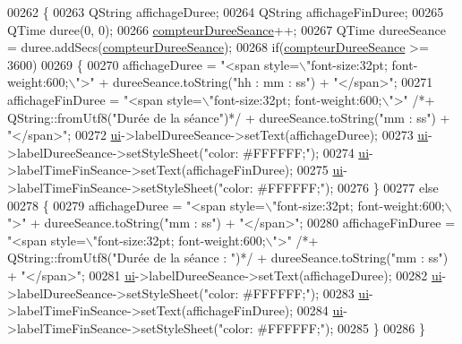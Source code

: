 \begin{DoxyCode}
00262 \{
00263     QString affichageDuree;
00264     QString affichageFinDuree;
00265     QTime duree(0, 0);
00266     \hyperlink{class_ttpa_ihm_abb5ab7cc023685e40cb278f0210f276f}{compteurDureeSeance}++;
00267     QTime dureeSeance = duree.addSecs(\hyperlink{class_ttpa_ihm_abb5ab7cc023685e40cb278f0210f276f}{compteurDureeSeance});
00268     \textcolor{keywordflow}{if}(\hyperlink{class_ttpa_ihm_abb5ab7cc023685e40cb278f0210f276f}{compteurDureeSeance} >= 3600)
00269     \{
00270         affichageDuree = \textcolor{stringliteral}{"<span style=\(\backslash\)"font-size:32pt; font-weight:600;\(\backslash\)">"} + dureeSeance.toString(\textcolor{stringliteral}{"hh :
       mm : ss"}) + \textcolor{stringliteral}{"</span>"};
00271         affichageFinDuree = \textcolor{stringliteral}{"<span style=\(\backslash\)"font-size:32pt; font-weight:600;\(\backslash\)">"} \textcolor{comment}{/*+
       QString::fromUtf8("Durée de la séance")*/} + dureeSeance.toString(\textcolor{stringliteral}{"mm : ss"}) + \textcolor{stringliteral}{"</span>"};
00272         \hyperlink{class_ttpa_ihm_ad5fae1222a667da158c26f3d0f0dce23}{ui}->labelDureeSeance->setText(affichageDuree);
00273         \hyperlink{class_ttpa_ihm_ad5fae1222a667da158c26f3d0f0dce23}{ui}->labelDureeSeance->setStyleSheet(\textcolor{stringliteral}{"color: #FFFFFF;"});
00274         \hyperlink{class_ttpa_ihm_ad5fae1222a667da158c26f3d0f0dce23}{ui}->labelTimeFinSeance->setText(affichageFinDuree);
00275         \hyperlink{class_ttpa_ihm_ad5fae1222a667da158c26f3d0f0dce23}{ui}->labelTimeFinSeance->setStyleSheet(\textcolor{stringliteral}{"color: #FFFFFF;"});
00276     \}
00277     \textcolor{keywordflow}{else}
00278     \{
00279         affichageDuree = \textcolor{stringliteral}{"<span style=\(\backslash\)"font-size:32pt; font-weight:600;\(\backslash\)">"}  + dureeSeance.toString(\textcolor{stringliteral}{"mm :
       ss"}) + \textcolor{stringliteral}{"</span>"};
00280         affichageFinDuree = \textcolor{stringliteral}{"<span style=\(\backslash\)"font-size:32pt; font-weight:600;\(\backslash\)">"} \textcolor{comment}{/*+
       QString::fromUtf8("Durée de la séance : ")*/} + dureeSeance.toString(\textcolor{stringliteral}{"mm : ss"}) + \textcolor{stringliteral}{"</span>"};
00281         \hyperlink{class_ttpa_ihm_ad5fae1222a667da158c26f3d0f0dce23}{ui}->labelDureeSeance->setText(affichageDuree);
00282         \hyperlink{class_ttpa_ihm_ad5fae1222a667da158c26f3d0f0dce23}{ui}->labelDureeSeance->setStyleSheet(\textcolor{stringliteral}{"color: #FFFFFF;"});
00283         \hyperlink{class_ttpa_ihm_ad5fae1222a667da158c26f3d0f0dce23}{ui}->labelTimeFinSeance->setText(affichageFinDuree);
00284         \hyperlink{class_ttpa_ihm_ad5fae1222a667da158c26f3d0f0dce23}{ui}->labelTimeFinSeance->setStyleSheet(\textcolor{stringliteral}{"color: #FFFFFF;"});
00285     \}
00286 \}
\end{DoxyCode}
\mbox{\label{class_ttpa_ihm_ad1fc60bf431308d8e52cbc5e35d0d3de}} 
